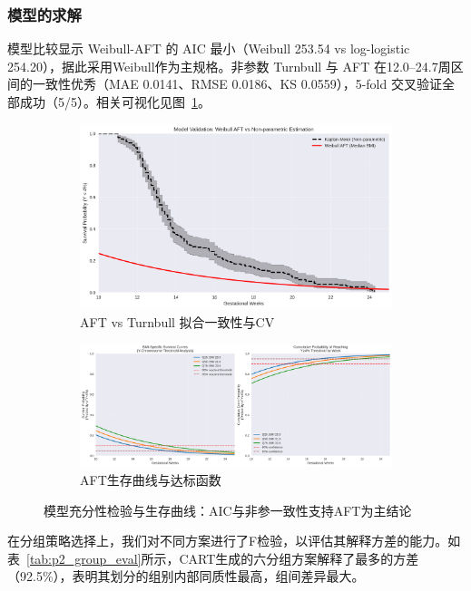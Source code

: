 \documentclass[withoutpreface]{cumcmthesis}
\begin{document}
\subsubsection{模型的求解}
模型比较显示 Weibull-AFT 的 AIC 最小（Weibull 253.54 vs log-logistic 254.20），据此采用Weibull作为主规格。非参数 Turnbull 与 AFT 在12.0–24.7周区间的一致性优秀（MAE 0.0141、RMSE 0.0186、KS 0.0559），5-fold 交叉验证全部成功（5/5）。相关可视化见图~\ref{fig:p2_validation_survival}。

\begin{figure}[htbp]
\centering
\begin{subfigure}{0.48\textwidth}
  \centering
  \includegraphics[width=\linewidth]{output/figures/p2_model_validation.png}
  \caption{AFT vs Turnbull 拟合一致性与CV}
\end{subfigure}\hfill
\begin{subfigure}{0.48\textwidth}
  \centering
  \includegraphics[width=\linewidth]{output/figures/p2_survival_curves_aft.png}
  \caption{AFT生存曲线与达标函数}
\end{subfigure}
\caption{模型充分性检验与生存曲线：AIC与非参一致性支持AFT为主结论}
\label{fig:p2_validation_survival}
\end{figure}

在分组策略选择上，我们对不同方案进行了F检验，以评估其解释方差的能力。如表~\ref{tab:p2_group_eval}所示，CART生成的六分组方案解释了最多的方差（92.5\%），表明其划分的组别内部同质性最高，组间差异最大。
\end{document}
